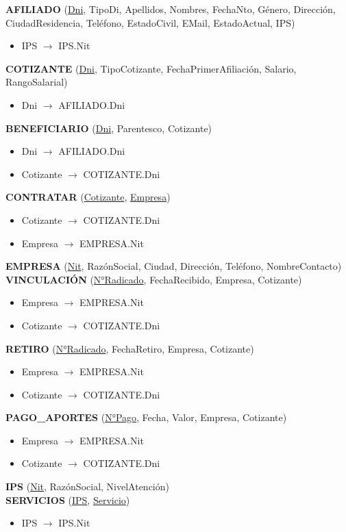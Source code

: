 \documentclass[12pt,a4paper]{article}
\begin{document}
\begin{tcolorbox}[title=Modelo Relacional]
\textbf{AFILIADO} (\underline{Dni}, TipoDi, Apellidos, Nombres, FechaNto, Género, Dirección, CiudadResidencia, Teléfono, EstadoCivil, EMail, EstadoActual, IPS)
\begin{itemize}
\item IPS $\rightarrow$ IPS.Nit
\end{itemize}
\textbf{COTIZANTE} (\underline{Dni}, TipoCotizante, FechaPrimerAfiliación, Salario, RangoSalarial)
\begin{itemize}
\item Dni $\rightarrow$ AFILIADO.Dni
\end{itemize}
\textbf{BENEFICIARIO} (\underline{Dni}, Parentesco, Cotizante)
\begin{itemize}
\item Dni $\rightarrow$ AFILIADO.Dni
\item Cotizante $\rightarrow$ COTIZANTE.Dni
\end{itemize}
\textbf{CONTRATAR} (\underline{Cotizante}, \underline{Empresa})
\begin{itemize}
\item Cotizante $\rightarrow$ COTIZANTE.Dni
\item Empresa $\rightarrow$ EMPRESA.Nit
\end{itemize}
\textbf{EMPRESA} (\underline{Nit}, RazónSocial, Ciudad, Dirección, Teléfono, NombreContacto)\\

\textbf{VINCULACIÓN} (\underline{N°Radicado}, FechaRecibido, Empresa, Cotizante)
\begin{itemize}
\item Empresa $\rightarrow$ EMPRESA.Nit
\item Cotizante $\rightarrow$ COTIZANTE.Dni
\end{itemize}
\textbf{RETIRO} (\underline{N°Radicado}, FechaRetiro, Empresa, Cotizante)
\begin{itemize}
\item Empresa $\rightarrow$ EMPRESA.Nit
\item Cotizante $\rightarrow$ COTIZANTE.Dni
\end{itemize}
\textbf{PAGO\_APORTES} (\underline{N°Pago}, Fecha, Valor, Empresa, Cotizante)
\begin{itemize}
\item Empresa $\rightarrow$ EMPRESA.Nit
\item Cotizante $\rightarrow$ COTIZANTE.Dni
\end{itemize}
\textbf{IPS} (\underline{Nit}, RazónSocial, NivelAtención)\\

\textbf{SERVICIOS} (\underline{IPS}, \underline{Servicio})
\begin{itemize}
\item IPS $\rightarrow$ IPS.Nit
\end{itemize}
\end{tcolorbox}
\end{document}
